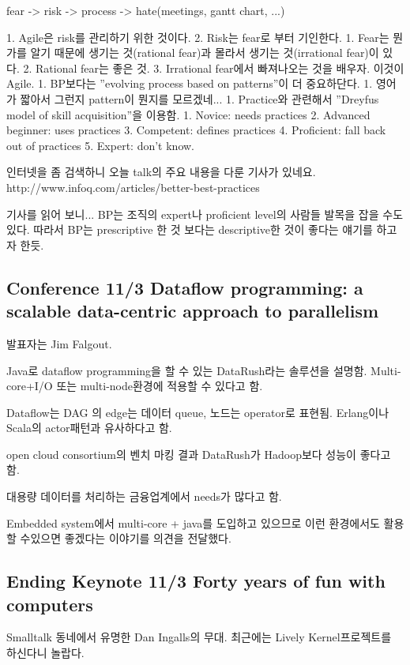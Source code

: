 \documentclass[a4paper]{article}
\begin{document}
fear -> risk -> process -> hate(meetings, gantt chart, ...)
 
1. Agile은 risk를 관리하기 위한 것이다.
2. Risk는 fear로 부터 기인한다.
1. Fear는 뭔가를 알기 때문에 생기는 것(rational fear)과 몰라서 생기는 것(irrational fear)이 있다.
2. Rational fear는 좋은 것.
3. Irrational fear에서 빠져나오는 것을 배우자. 이것이 Agile.
1. BP보다는 ”evolving process based on patterns”이 더 중요하단다.
1. 영어가 짧아서 그런지 pattern이 뭔지를 모르겠네...
1. Practice와 관련해서 ”Dreyfus model of skill acquisition”을 이용함.
1. Novice: needs practices
2. Advanced beginner: uses practices
3. Competent: defines practices
4. Proficient: fall back out of practices
5. Expert: don’t know.
 
인터넷을 좀 검색하니 오늘 talk의 주요 내용을 다룬 기사가 있네요.
http://www.infoq.com/articles/better-best-practices
 
기사를 읽어 보니...
BP는 조직의 expert나 proficient level의 사람들 발목을 잡을 수도 있다.
따라서 BP는 prescriptive 한 것 보다는 descriptive한 것이 좋다는 얘기를 하고자 한듯.
 
\subsection{Conference 11/3 Dataflow programming: a scalable data-centric approach to parallelism}
 
발표자는 Jim Falgout.
 
Java로 dataflow programming을 할 수 있는 DataRush라는 솔루션을 설명함.
Multi-core+I/O 또는 multi-node환경에 적용할 수 있다고 함.
 
Dataflow는 DAG 의 edge는 데이터 queue, 노드는 operator로 표현됨.
Erlang이나 Scala의 actor패턴과 유사하다고 함.
 
open cloud consortium의 벤치 마킹 결과 DataRush가 Hadoop보다 성능이 좋다고 함.
 
대용량 데이터를 처리하는 금융업계에서 needs가 많다고 함. 
 
Embedded system에서 multi-core + java를 도입하고 있으므로 이런 환경에서도 활용할 수있으면 좋겠다는 이야기를 의견을 전달했다.
 
\subsection{Ending Keynote 11/3 Forty years of fun with computers}
 
Smalltalk 동네에서 유명한 Dan Ingalls의 무대.
최근에는  Lively Kernel프로젝트를 하신다니 놀랍다.
 
\end{document}
